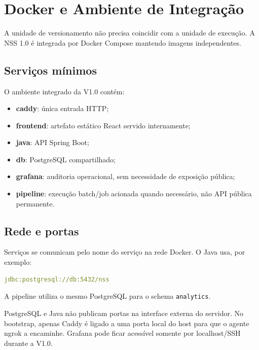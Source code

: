 \section{Docker e Ambiente de Integração}

A unidade de versionamento não precisa coincidir com a unidade de execução. A NSS 1.0 é integrada por Docker Compose mantendo imagens independentes.

\subsection{Serviços mínimos}

O ambiente integrado da V1.0 contém:

\begin{itemize}
    \item \textbf{caddy}: única entrada HTTP;
    \item \textbf{frontend}: artefato estático React servido internamente;
    \item \textbf{java}: API Spring Boot;
    \item \textbf{db}: PostgreSQL compartilhado;
    \item \textbf{grafana}: auditoria operacional, sem necessidade de exposição pública;
    \item \textbf{pipeline}: execução batch/job acionada quando necessário, não API pública permanente.
\end{itemize}

\subsection{Rede e portas}

Serviços se comunicam pelo nome do serviço na rede Docker. O Java usa, por exemplo:

\begin{lstlisting}[language=YAML]
jdbc:postgresql://db:5432/nss
\end{lstlisting}

A pipeline utiliza o mesmo PostgreSQL para o schema \texttt{analytics}.

\begin{regra}
PostgreSQL e Java não publicam portas na interface externa do servidor. No bootstrap, apenas Caddy é ligado a uma porta local do host para que o agente ngrok a encaminhe. Grafana pode ficar acessível somente por localhost/SSH durante a V1.0.
\end{regra}

